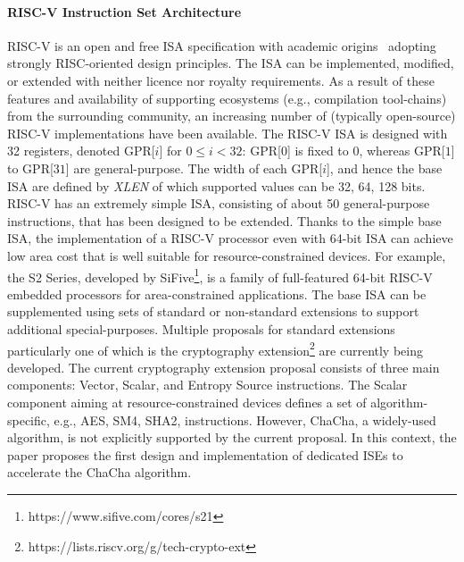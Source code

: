 \paragraph{RISC-V Instruction Set Architecture}
RISC-V is an open and free ISA specification with academic origins~\cite{riscv:14} adopting strongly RISC-oriented design principles. 
The ISA can be implemented, modified, or extended with neither licence nor royalty requirements.
As a result of these features and availability of supporting ecosystems (e.g., compilation tool-chains) from the surrounding community,
an increasing number of (typically open-source) RISC-V implementations have been available.
The RISC-V ISA is designed with 32 registers, denoted GPR[$i$] for $0 \le i < 32$: GPR[$0$] is fixed to 0, whereas GPR[$1$] to GPR[$31$] are general-purpose. 
The width of each GPR[$i$], and hence the base ISA are defined by \emph{XLEN} of which supported values can be 32, 64, 128 bits. 
RISC-V has an extremely simple ISA, consisting of about 50 general-purpose instructions, that has been designed to be extended.
Thanks to the simple base ISA, the implementation of a RISC-V processor even with 64-bit ISA can achieve low area cost 
that is well suitable for resource-constrained devices. 
For example, the S2 Series, developed by SiFive\footnote{https://www.sifive.com/cores/s21}, is a family of full-featured 64-bit RISC-V embedded processors for area-constrained applications.
The base ISA can be supplemented using sets of standard or non-standard extensions to support additional special-purposes.
Multiple proposals for standard extensions particularly one of which is the cryptography extension\footnote{https://lists.riscv.org/g/tech-crypto-ext} are currently being developed. The current cryptography extension proposal consists of three main components: Vector, Scalar, and Entropy Source instructions.
The Scalar component aiming at resource-constrained devices defines a set of algorithm-specific, e.g., AES, SM4, SHA2, instructions. 
However, ChaCha, a widely-used algorithm, is not explicitly supported by the current proposal. 
In this context, the paper proposes the first design and implementation of dedicated ISEs to accelerate the ChaCha algorithm.

